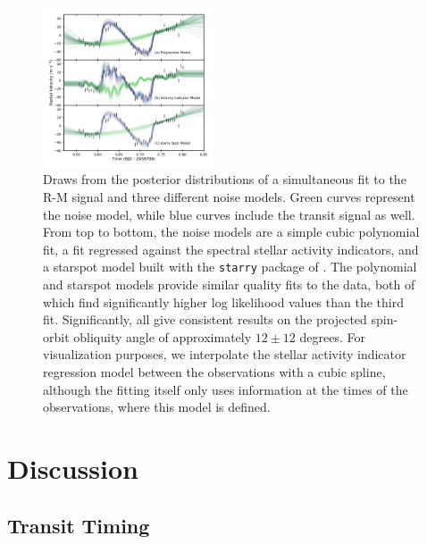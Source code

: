 \documentclass[twocolumn]{aastex63}
\begin{document}
\begin{figure}[!tbh]
  \begin{center}
    \includegraphics[width=0.45\textwidth, trim={0cm 0.0cm 1cm 1cm}, clip=true]{../figures/model_comp.pdf}
   \end{center}
  \caption{Draws from the posterior distributions of a simultaneous fit to the
  R-M signal and three different noise models. Green curves represent the noise model, while blue curves include the transit signal as well. From top to bottom, the noise models are a simple cubic polynomial fit, a fit regressed against the spectral stellar activity indicators, and a starspot model built with the \texttt{starry} package of \citep{Luger19}. The polynomial and starspot models provide similar quality fits to the data, both of which find significantly higher log likelihood values than the third fit. Significantly, all give consistent results on the projected spin-orbit obliquity angle of approximately $12 \pm 12$ degrees. For visualization purposes, we interpolate the stellar activity indicator regression model between the observations with a cubic spline, although the fitting itself only uses information at the times of the observations, where this model is defined.}
  \label{fig:models}
\end{figure}

\section{Discussion}
\label{sec:discussion}




\subsection{Transit Timing}
\end{document}
